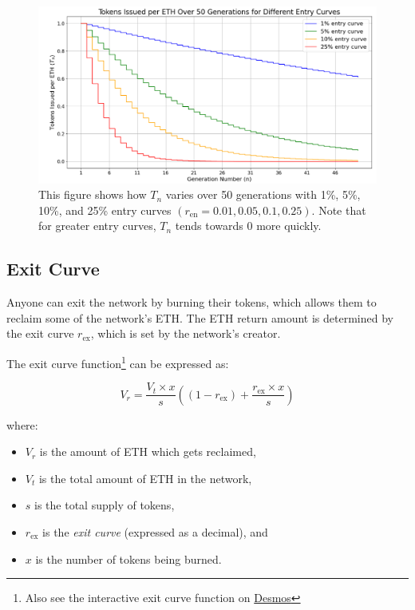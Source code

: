 \documentclass{article}
\begin{document}
\clearpage
\begin{figure}[h]
  \centering
  \includegraphics[width=\textwidth]{figures/multi-entry-curves.png}
  \caption{This figure shows how $T_n$ varies over 50 generations with 1\%, 5\%, 10\%, and 25\% entry curves $(r_{\text{en}} = 0.01, 0.05, 0.1, 0.25)$. Note that for greater entry curves, $T_n$ tends towards 0 more quickly.}
\end{figure}

\subsection{Exit Curve}

Anyone can exit the network by burning their tokens, which allows them to reclaim some of the network's ETH. The ETH return amount is determined by the exit curve $r_{\text{ex}}$, which is set by the network's creator.

The exit curve function\footnote{Also see the interactive exit curve function on \href{https://www.desmos.com/calculator/9pewqesyj5}{Desmos}} can be expressed as:

\begin{equation}
  V_r = \frac{V_t \times x}{s}\left(\left(1-r_{\text{ex}}\right)+\frac{r_{\text{ex}} \times x}{s}\right)
\end{equation}

where:
\begin{itemize}
  \item $V_r$ is the amount of ETH which gets reclaimed,
  \item $V_t$ is the total amount of ETH in the network,
  \item $s$ is the total supply of tokens,
  \item $r_{\text{ex}}$ is the \textit{exit curve} (expressed as a decimal), and
  \item $x$ is the number of tokens being burned.
\end{itemize}
\end{document}
